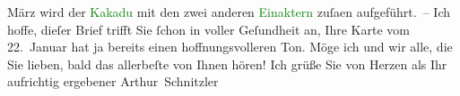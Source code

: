                   März wird der \textcolor{green}{Kakadu}{}\ledrightnote{\textcolor{green}{Der grüne Kakadu. Groteske in einem Akt}} mit den zwei anderen
                  \textcolor{green}{Einaktern}{} zuſa{\geminationm}en aufgeführt. –\pend
           \pstart
           Ich hoffe, dieſer Brief trifft Sie ſchon in voller Geſundheit an, Ihre Karte vom
                  22. Januar hat ja bereits einen hoffnungsvolleren Ton. Möge ich und
               wir alle, die Sie lieben, bald das allerbeſte von Ihnen hören!\pend
           \pstart Ich grüße Sie von Herzen als Ihr aufrichtig ergebener \spacefill\mbox{Arthur
                  Schnitzler}\pend{}\endnumbering{}  
      